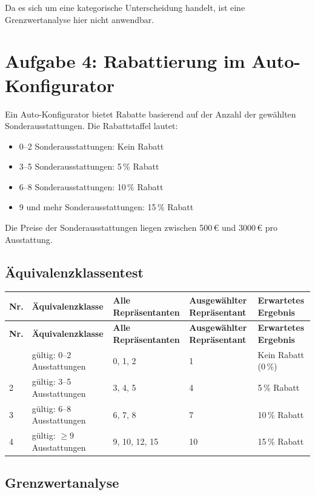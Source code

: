 \documentclass[
	fontsize=12pt,          %
	paper=a4,               %
	numbers=noenddot,       %
	listof=totoc,           %
	listof=entryprefix,     %
	listof=nochaptergap,    %
	bibliography=totoc,     %
	parskip=half,           %
	openany                 %
]{scrbook}
\begin{document}
Da es sich um eine kategorische Unterscheidung handelt, ist eine Grenzwertanalyse hier nicht anwendbar.


\chapter*{Aufgabe 4: Rabattierung im Auto-Konfigurator}

Ein Auto-Konfigurator bietet Rabatte basierend auf der Anzahl der gewählten Sonderausstattungen.
Die Rabattstaffel lautet:
\begin{itemize}
	\item 0--2 Sonderausstattungen: Kein Rabatt
	\item 3--5 Sonderausstattungen: 5\,\% Rabatt
	\item 6--8 Sonderausstattungen: 10\,\% Rabatt
	\item 9 und mehr Sonderausstattungen: 15\,\% Rabatt
\end{itemize}

Die Preise der Sonderausstattungen liegen zwischen 500\,€ und 3000\,€ pro Ausstattung.

\section*{Äquivalenzklassentest}

\begin{longtable}{| p{0.5cm} | p{3.5cm} | p{3.8cm} | p{2.5cm} | p{2.8cm} |}
	\hline
	\textbf{Nr.} & \textbf{Äquivalenzklasse} & \textbf{Alle Repräsentanten} & \textbf{Ausgewählter Repräsentant} & \textbf{Erwartetes Ergebnis} \\ \hline
	\endfirsthead
	\hline
	\textbf{Nr.} & \textbf{Äquivalenzklasse} & \textbf{Alle Repräsentanten} & \textbf{Ausgewählter Repräsentant} & \textbf{Erwartetes Ergebnis} \\ \hline
	\endhead
	\hline
	\endfoot
	1 & gültig: 0--2 Ausstattungen & 0, 1, 2 & 1 & Kein Rabatt (0\,\%) \\ \hline
	2 & gültig: 3--5 Ausstattungen & 3, 4, 5 & 4 & 5\,\% Rabatt \\ \hline
	3 & gültig: 6--8 Ausstattungen & 6, 7, 8 & 7 & 10\,\% Rabatt \\ \hline
	4 & gültig: $\geq 9$ Ausstattungen & 9, 10, 12, 15 & 10 & 15\,\% Rabatt \\ \hline
\end{longtable}

\section*{Grenzwertanalyse}
\end{document}
